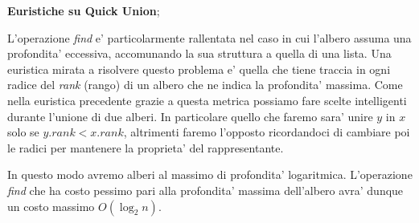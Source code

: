 \documentclass{article}
\begin{document}
\textbf{Euristiche su Quick Union};

L'operazione \emph{find} e' particolarmente rallentata nel caso in cui l'albero
assuma una profondita' eccessiva, accomunando la sua struttura a quella di una lista.
Una euristica mirata a risolvere questo problema e' quella che tiene traccia in ogni
radice del \emph{rank} (rango) di un albero che ne indica la profondita' massima.
Come nella euristica precedente grazie a questa metrica possiamo fare scelte
intelligenti durante l'unione di due alberi. In particolare quello che faremo sara'
unire $y$ in $x$ solo se $y.rank < x.rank$, altrimenti faremo l'opposto ricordandoci
di cambiare poi le radici per mantenere la proprieta' del rappresentante.

In questo modo avremo alberi al massimo di profondita' logaritmica. L'operazione
\emph{find} che ha costo pessimo pari alla profondita' massima dell'albero avra'
dunque un costo massimo $O(\log_2 n)$.
\end{document}
